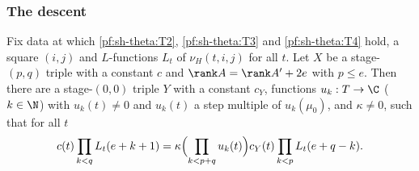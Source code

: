 \subsubsection{The descent}

\begin{lemma}\label{pf:sh-theta:descent}
Fix data at which \ref{pf:sh-theta:T2}, \ref{pf:sh-theta:T3} and \ref{pf:sh-theta:T4} hold, a square $(i,j)$ and
$L$-functions $L_t$ of $\nu_H(t,i,j)$ for all $t$. Let $X$ be a stage-$(p,q)$ triple with a constant $c$ and
$\rank A=\rank A'+2e$ with $p\le e$. Then there are a stage-$(0,0)$ triple $Y$ with a constant $c_Y$, functions
$u_k:T\to\C$ ($k\in\N$) with $u_k(t)\ne0$ and $u_k(t)$ a step multiple of $u_k(\mu_0)$, and $\kappa\ne0$, such that for all
$t$
\begin{equation}\label{eq:pf:sh-theta:descent}
c(t)\prod_{k<q}L_t(e+k+1)=\kappa\Bigl(\prod_{k<p+q}u_k(t)\Bigr)c_Y(t)\prod_{k<p}L_t(e+q-k).
\end{equation}
\end{lemma}


